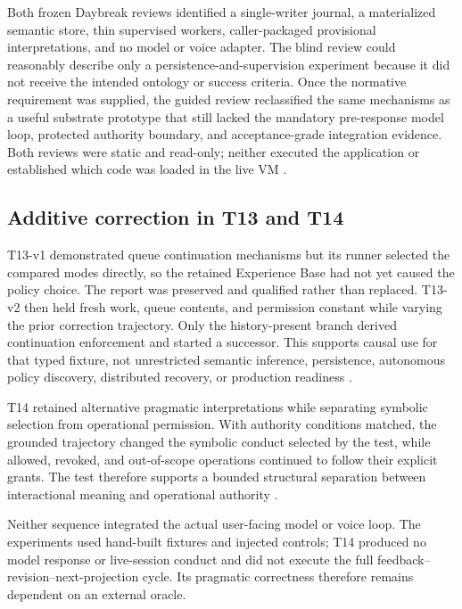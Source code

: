 \documentclass[10pt,a4paper]{article}
\begin{document}
Both frozen Daybreak reviews identified a single-writer journal, a materialized semantic store, thin supervised workers, caller-packaged provisional interpretations, and no model or voice adapter. The blind review could reasonably describe only a persistence-and-supervision experiment because it did not receive the intended ontology or success criteria. Once the normative requirement was supplied, the guided review reclassified the same mechanisms as a useful substrate prototype that still lacked the mandatory pre-response model loop, protected authority boundary, and acceptance-grade integration evidence. Both reviews were static and read-only; neither executed the application or established which code was loaded in the live VM \cite{daybreakblind,daybreakguided}.

\subsection{Additive correction in T13 and T14}

T13-v1 demonstrated queue continuation mechanisms but its runner selected the compared modes directly, so the retained Experience Base had not yet caused the policy choice. The report was preserved and qualified rather than replaced. T13-v2 then held fresh work, queue contents, and permission constant while varying the prior correction trajectory. Only the history-present branch derived continuation enforcement and started a successor. This supports causal use for that typed fixture, not unrestricted semantic inference, persistence, autonomous policy discovery, distributed recovery, or production readiness \cite{t13v1report,t13v2report,ctxevolution}.

T14 retained alternative pragmatic interpretations while separating symbolic selection from operational permission. With authority conditions matched, the grounded trajectory changed the symbolic conduct selected by the test, while allowed, revoked, and out-of-scope operations continued to follow their explicit grants. The test therefore supports a bounded structural separation between interactional meaning and operational authority \cite{t14report,ctxevolution}.

Neither sequence integrated the actual user-facing model or voice loop. The experiments used hand-built fixtures and injected controls; T14 produced no model response or live-session conduct and did not execute the full feedback--revision--next-projection cycle. Its pragmatic correctness therefore remains dependent on an external oracle.
\end{document}

